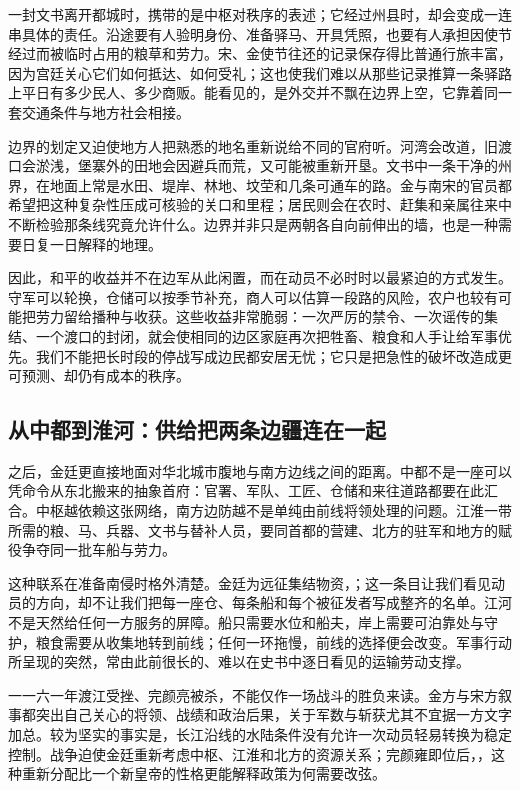 一封文书离开都城时，携带的是中枢对秩序的表述；它经过州县时，却会变成一连串具体的责任。沿途要有人验明身份、准备驿马、开具凭照，也要有人承担因使节经过而被临时占用的粮草和劳力。宋、金使节往还的记录保存得比普通行旅丰富，因为宫廷关心它们如何抵达、如何受礼；这也使我们难以从那些记录推算一条驿路上平日有多少民人、多少商贩。能看见的，是外交并不飘在边界上空，它靠着同一套交通条件与地方社会相接。

边界的划定又迫使地方人把熟悉的地名重新说给不同的官府听。河湾会改道，旧渡口会淤浅，堡寨外的田地会因避兵而荒，又可能被重新开垦。文书中一条干净的州界，在地面上常是水田、堤岸、林地、坟茔和几条可通车的路。金与南宋的官员都希望把这种复杂性压成可核验的关口和里程；居民则会在农时、赶集和亲属往来中不断检验那条线究竟允许什么。边界并非只是两朝各自向前伸出的墙，也是一种需要日复一日解释的地理。

因此，和平的收益并不在边军从此闲置，而在动员不必时时以最紧迫的方式发生。守军可以轮换，仓储可以按季节补充，商人可以估算一段路的风险，农户也较有可能把劳力留给播种与收获。这些收益非常脆弱：一次严厉的禁令、一次谣传的集结、一个渡口的封闭，就会使相同的边区家庭再次把牲畜、粮食和人手让给军事优先。我们不能把长时段的停战写成边民都安居无忧；它只是把急性的破坏改造成更可预测、却仍有成本的秩序。

\subsection{从中都到淮河：供给把两条边疆连在一起}

之后，金廷更直接地面对华北城市腹地与南方边线之间的距离。中都不是一座可以凭命令从东北搬来的抽象首府：官署、军队、工匠、仓储和来往道路都要在此汇合。中枢越依赖这张网络，南方边防越不是单纯由前线将领处理的问题。江淮一带所需的粮、马、兵器、文书与替补人员，要同首都的营建、北方的驻军和地方的赋役争夺同一批车船与劳力。

这种联系在准备南侵时格外清楚。金廷为远征集结物资，；这一条目让我们看见动员的方向，却不让我们把每一座仓、每条船和每个被征发者写成整齐的名单。江河不是天然给任何一方服务的屏障。船只需要水位和船夫，岸上需要可泊靠处与守护，粮食需要从收集地转到前线；任何一环拖慢，前线的选择便会改变。军事行动所呈现的突然，常由此前很长的、难以在史书中逐日看见的运输劳动支撑。

一一六一年渡江受挫、完颜亮被杀，不能仅作一场战斗的胜负来读。金方与宋方叙事都突出自己关心的将领、战绩和政治后果，关于军数与斩获尤其不宜据一方文字加总。较为坚实的事实是，长江沿线的水陆条件没有允许一次动员轻易转换为稳定控制。战争迫使金廷重新考虑中枢、江淮和北方的资源关系；完颜雍即位后，，这种重新分配比一个新皇帝的性格更能解释政策为何需要改弦。

